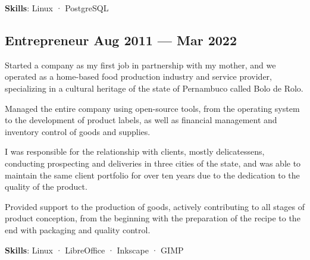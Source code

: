 \textbf{Skills}: Linux · PostgreSQL

\vspace{1em}
\subsection{Entrepreneur \hfill Aug 2011 --- Mar 2022}

\begin{zitemize}
  \item
    Started a company as my first job in partnership with my mother, and we
    operated as a home-based food production industry and service provider,
    specializing in a cultural heritage of the state of Pernambuco called Bolo
    de Rolo.
  \item
    Managed the entire company using open-source tools, from the operating
    system to the development of product labels, as well as financial
    management and inventory control of goods and supplies.
  \item
    I was responsible for the relationship with clients, mostly delicatessens,
    conducting prospecting and deliveries in three cities of the state, and was
    able to maintain the same client portfolio for over ten years due to the
    dedication to the quality of the product.
  \item
    Provided support to the production of goods, actively contributing to all
    stages of product conception, from the beginning with the preparation of
    the recipe to the end with packaging and quality control.
\end{zitemize}

\textbf{Skills}: Linux · LibreOffice · Inkscape · GIMP

\vspace{.5em}
